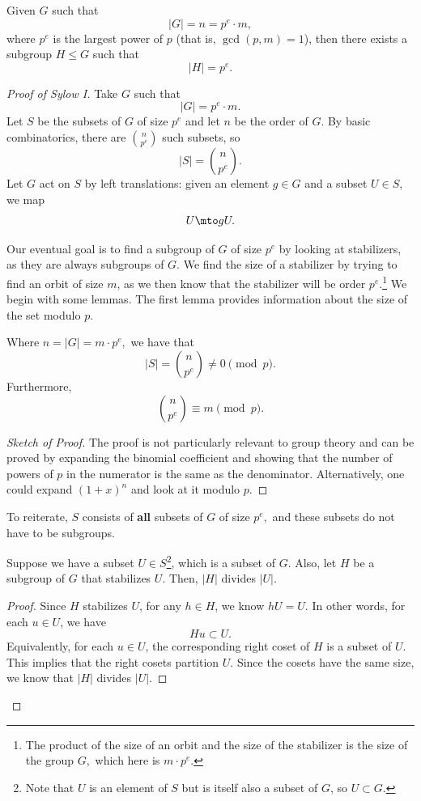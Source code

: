\begin{theorem}[Sylow I]

Given $G$ such that \[|G| = n = p^e \cdot m,\] where $p^e$ is the largest power of $p$ (that is, $\gcd(p, m) = 1$), then there exists a subgroup $H \leq G$ such that \[|H| = p^e.\]
\end{theorem}
\begin{proof}[Proof of Sylow I]
    Take $G$ such that \[|G| = p^e\cdot m.\]Let $S$ be the subsets of $G$ of size $p^e$ and let $n$ be the order of $G$. By basic combinatorics, there are $\binom{n}{p^e}$ such subsets, so \[|S| = \binom{n}{p^e}.\] Let $G$ act on $S$ by left translations: given an element $g \in G$ and a subset $U \in S$, we map \[U \mto gU.\]

    Our eventual goal is to find a subgroup of $G$ of size $p^e$ by looking at stabilizers, as they are always subgroups of $G.$ We find the size of a stabilizer by trying to find an orbit of size $m$, as we then know that the stabilizer will be order $p^e$.\footnote{The product of the size of an orbit and the size of the stabilizer is the size of the group $G,$ which here is $m \cdot p^e.$}
    We begin with some lemmas. The first lemma provides information about the size of the set modulo $p.$ 
    \begin{lemma}
    Where $n = |G| = m \cdot p^e,$ we have that \[|S| = \binom{n}{ p^e} \neq 0 \pmod{p}.\] Furthermore, \[\binom{n}{ p^e} \equiv m \pmod{p}.\] 
    \end{lemma}
    \begin{proof}[Sketch of Proof]
        The proof is not particularly relevant to group theory and can be proved by expanding the binomial coefficient and showing that the number of powers of $p$ in the numerator is the same as the denominator. Alternatively, one could expand $(1+x)^n$ and look at it modulo $p$.
    \end{proof}
    
    To reiterate, $S$ consists of \textbf{all} subsets of $G$ of size $p^e,$ and these subsets do not have to be subgroups. 
    
    \begin{lemma}
        Suppose we have a subset $U \in S$\footnote{Note that $U$ is an element of $S$ but is itself also a subset of $G$, so $U \subset G.$}, which is a subset of $G$. Also, let $H$ be a subgroup of $G$ that stabilizes $U$. Then, $|H|$ divides $|U|.$
    \end{lemma}
    \begin{proof}
        Since $H$ stabilizes $U$, for any $h \in H$, we know $hU = U$. In other words, for each $u \in U$, we have \[Hu \subset U.\] Equivalently, for each $u\in U$, the corresponding right coset of $H$ is a subset of $U$. This implies that the right cosets partition $U$. Since the cosets have the same size, we know that $|H|$ divides $|U|$. 
    \end{proof}


\end{proof}
